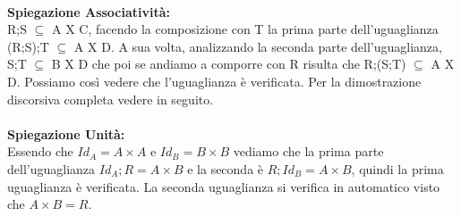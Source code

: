\\
\textbf{Spiegazione Associatività:}\\
R;S $\subseteq$ A X C, facendo la composizione con T la prima parte dell'uguaglianza (R;S);T $\subseteq$ A X D. A sua volta, analizzando la seconda parte dell'uguaglianza, S;T $\subseteq$ B X D che poi se andiamo a comporre con R risulta che R;(S;T) $\subseteq$ A X D. Possiamo così vedere che l'uguaglianza è verificata. Per la dimostrazione discorsiva completa vedere in seguito. \\ \\
\textbf{Spiegazione Unità:}\\
Essendo che $Id_A = A \times A$ e $Id_B = B \times B$ vediamo che la prima parte dell'uguaglianza $Id_A;R = A \times B$ e la seconda è $R;Id_B = A \times B$, quindi la prima uguaglianza è verificata. La seconda uguaglianza si verifica in automatico visto che $A \times B = R$.


